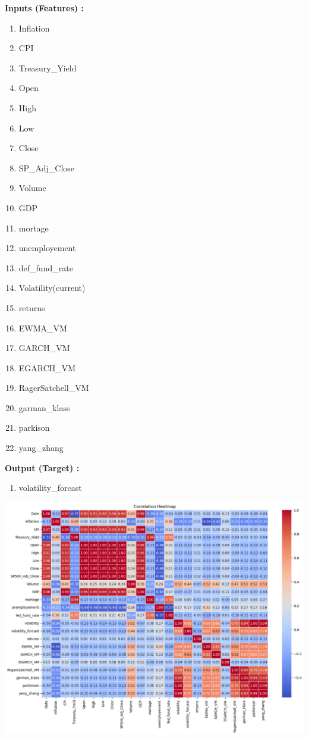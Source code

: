 \documentclass[letterpaper,11pt]{article}
\begin{document}
\begin{minipage}[t]{0.49\textwidth}
    \textbf{Inputs (Features) :}
    \begin{enumerate}
        \item Inflation
        \item CPI
        \item Treasury\_Yield
        \item Open
        \item High
        \item Low
        \item Close
        \item SP\_Adj\_Close
        \item Volume
        \item GDP
        \item mortage
        \item unemployement
        \item def\_fund\_rate
        \item Volatility(current)
        \item returns
        \item EWMA\_VM
        \item GARCH\_VM
        \item EGARCH\_VM
        \item RagerSatchell\_VM
        \item garman\_klass
        \item parkison
        \item yang\_zhang
    \end{enumerate}
\end{minipage}
\hfill
\begin{minipage}[t]{0.49\textwidth}
    \textbf{Output (Target) :}
    \begin{enumerate}
        \item volatility\_forcast
    \end{enumerate}

\end{minipage}


\newpage
\includegraphics[width=\linewidth]{img/corr_matrix.png}
\end{document}
